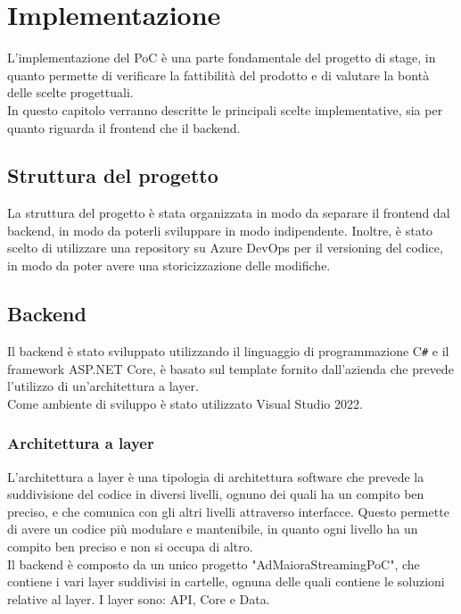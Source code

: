 \chapter{Implementazione}
\label{cap:implementazione}

L'implementazione del PoC è una parte fondamentale del progetto di stage, in quanto permette di verificare la fattibilità del prodotto e di valutare la bontà delle scelte progettuali.\\
In questo capitolo verranno descritte le principali scelte implementative, sia per quanto riguarda il frontend che il backend.\\

\section{Struttura del progetto}
La struttura del progetto è stata organizzata in modo da separare il frontend dal backend, in modo da poterli sviluppare in modo indipendente. Inoltre, è stato scelto di utilizzare una repository su Azure DevOps per il versioning del codice, in modo da poter avere una storicizzazione delle modifiche.
\section{Backend}
Il backend è stato sviluppato utilizzando il linguaggio di programmazione C\texttt{\#} e il framework ASP.NET Core, è basato sul template fornito dall'azienda che prevede l'utilizzo di un'architettura a layer.\\
Come ambiente di sviluppo è stato utilizzato Visual Studio 2022.\\
\subsection{Architettura a layer}
L'architettura a layer è una tipologia di architettura software che prevede la suddivisione del codice in diversi livelli, ognuno dei quali ha un compito ben preciso, e che comunica con gli altri livelli attraverso interfacce. Questo permette di avere un codice più modulare e mantenibile, in quanto ogni livello ha un compito ben preciso e non si occupa di altro.\\
Il backend è composto da un unico progetto "AdMaioraStreamingPoC", che contiene i vari layer suddivisi in cartelle, ognuna delle quali contiene le soluzioni relative al layer. I layer sono: API, Core e Data.\\


